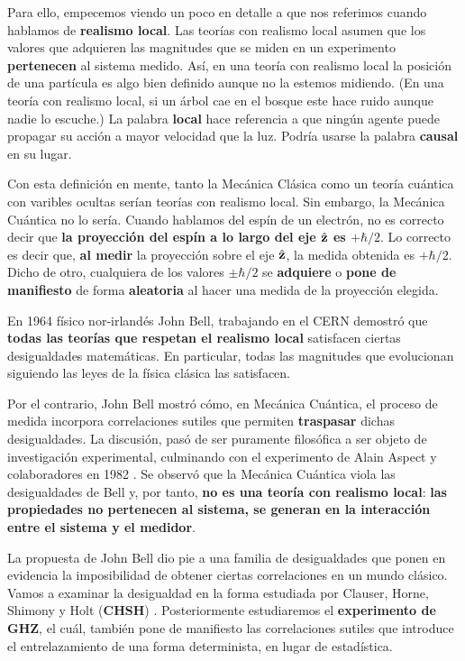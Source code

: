 \documentclass[a4paper,11pt]{book} %
\numberwithin{equation}{chapter}
\begin{document}
Para ello, empecemos viendo un poco en detalle a que nos referimos cuando hablamos de \textbf{realismo local}. Las teorías con realismo local asumen que los valores que adquieren las magnitudes que se miden en un experimento \textbf{pertenecen} al sistema medido. Así, en una teoría con realismo local la posición de una partícula es algo bien definido aunque no la estemos midiendo. (En una teoría con realismo local, si un árbol cae en el bosque este hace ruido aunque nadie lo escuche.) La palabra \textbf{local} hace referencia a que ningún agente puede propagar su acción a mayor velocidad que la luz. Podría usarse la palabra \textbf{causal} en su lugar. 

Con esta definición en mente, tanto la Mecánica Clásica como un teoría cuántica con varibles ocultas serían teorías con realismo local. Sin embargo, la Mecánica Cuántica no lo sería. Cuando hablamos del espín de un electrón, no es correcto decir que \textbf{la proyección del espín a lo largo del eje $\hat{\bf z}$ es $+\hbar/2$}. Lo correcto es decir que, \textbf{al medir} la proyección sobre el eje $\hat{\bf z}$, la medida obtenida es $+\hbar/2$.  Dicho de otro, cualquiera de los valores $\pm\hbar/2$ se \textbf{adquiere} o \textbf{pone de manifiesto}  de forma \textbf{aleatoria} al hacer una medida de la proyección elegida.

En 1964  físico nor-irlandés John Bell, trabajando en el CERN demostró \cite{bib_Bell} que \textbf{todas las teorías que respetan el realismo local} satisfacen ciertas desigualdades matemáticas. En particular, todas las magnitudes que evolucionan siguiendo las leyes de la física clásica las satisfacen.

Por el contrario, John Bell mostró cómo, en Mecánica Cuántica, el proceso de medida incorpora correlaciones sutiles que permiten \textbf{traspasar} dichas desigualdades. La discusión, pasó de ser puramente filosófica a ser objeto de investigación experimental, culminando con el  experimento de Alain Aspect y colaboradores en 1982 \cite{bib_Bell_experiment}. Se observó que la Mecánica Cuántica viola las desigualdades de Bell y, por tanto, \textbf{no es una teoría con realismo local}: \textbf{las propiedades no pertenecen al sistema, se generan en la interacción entre el sistema y el medidor}.

La propuesta de John Bell dio pie a una familia de desigualdades que ponen en evidencia la imposibilidad de obtener ciertas correlaciones en un mundo clásico. Vamos a examinar la desigualdad en la forma estudiada por Clauser, Horne, Shimony y Holt (\textbf{CHSH}) \cite{bib_Bell_CHSH}. Posteriormente estudiaremos el \textbf{experimento de GHZ}, el cuál, también pone de manifiesto las correlaciones sutiles que introduce el entrelazamiento de una forma determinista, en lugar de estadística.
\end{document}
